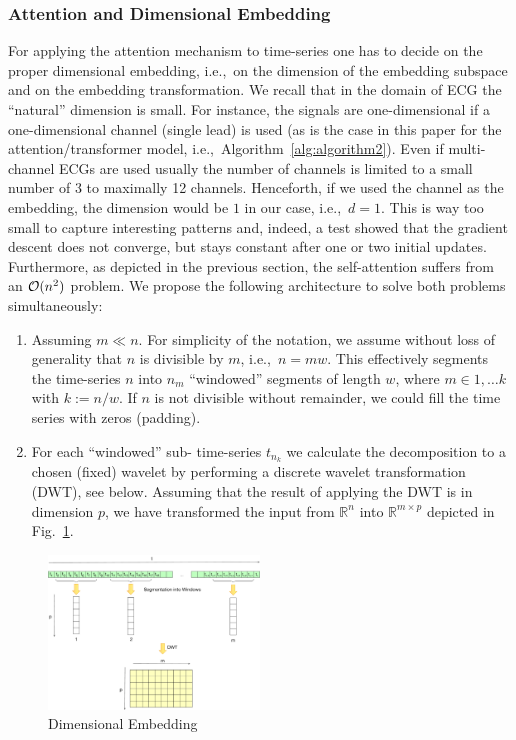\documentclass{ieeeaccess}
\begin{document}
\subsubsection{Attention and Dimensional Embedding}
For applying the attention mechanism to time-series one has to decide on the proper dimensional embedding, i.e.,\ on the dimension of the embedding subspace and on the embedding transformation. We recall that in the domain of ECG the ``natural'' dimension is small. For instance, the signals are one-dimensional if a one-dimensional channel (single lead) is used (as is the case in this paper for the attention/transformer model, i.e.,\ Algorithm~\ref{alg:algorithm2}). Even if multi-channel ECGs are used usually the number of channels is limited to a small number of 3 to maximally 12 channels. Henceforth, if we used the channel as the embedding, the dimension would be $1$ in our case, i.e.,\ $d=1$. This is way too small to capture interesting patterns and, indeed, a test showed that the gradient descent does not converge, but stays constant after one or two initial updates. Furthermore, as depicted in the previous section, the self-attention suffers from an  ${\cal O}(n^2)$ problem. We propose the following architecture to solve both problems simultaneously:
\begin{enumerate}
\item Assuming $m \ll n$. For simplicity of the notation, we assume without loss of generality that $n$ is divisible by $m$, i.e.,\ $n = mw$. This effectively segments the time-series $n$ into $n_m$  ``windowed'' segments of length $w$, where $m\in 1, \ldots k$ with $k:=n/w$. If $n$ is not divisible without remainder, we could fill the time series with zeros (padding).
\item For each ``windowed'' sub- time-series $t_{n_k}$ we calculate the decomposition to a chosen (fixed) wavelet by performing a discrete wavelet transformation (DWT), see below. Assuming that the result of applying the DWT is in dimension $p$, we have transformed the input from $\mathbb{R}^{n}$ into $\mathbb{R}^{m\times p}$ depicted in Fig.~\ref{fig:dimEmbedding}.
\end{enumerate}

\begin{figure}[!ht]
\includegraphics[width=0.5\textwidth]{Images/DimEmbedding}
\caption{Dimensional Embedding\label{fig:dimEmbedding}}
\end{figure}   
\end{document}
